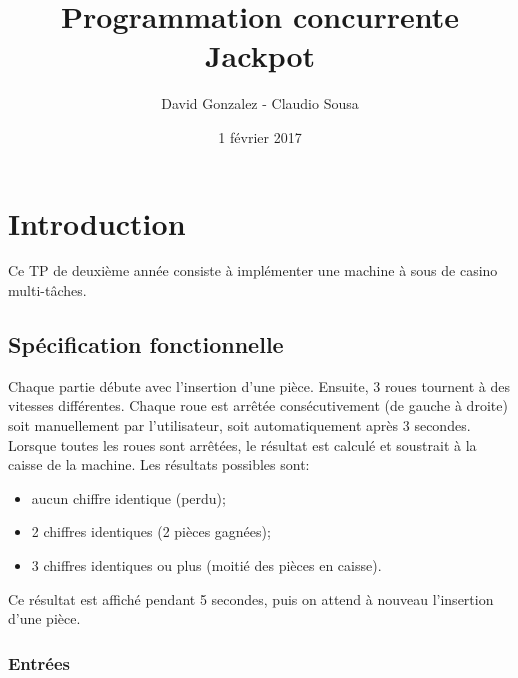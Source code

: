 \documentclass[11pt, a4paper]{article}
\begin{document}
\title
{
    \Huge{Programmation concurrente} \\
    \Huge{Jackpot}
}
\author
{
    \LARGE{David Gonzalez - Claudio Sousa}
}
\date{1 février 2017}
\maketitle

\begin{center}
\end{center}

\thispagestyle{empty}

\newpage

\section{Introduction}

Ce TP de deuxième année consiste à implémenter une machine à sous de casino multi-tâches.

\subsection{Spécification fonctionnelle}

Chaque partie débute avec l'insertion d'une pièce.
Ensuite, 3 roues tournent à des vitesses différentes.
Chaque roue est arrêtée consécutivement (de gauche à droite)
soit manuellement par l'utilisateur, soit automatiquement après 3 secondes. \\

Lorsque toutes les roues sont arrêtées, le résultat est calculé et soustrait à la caisse de la machine.
Les résultats possibles sont:
\begin{itemize}
    \item aucun chiffre identique (perdu);
    \item 2 chiffres identiques (2 pièces gagnées);
    \item 3 chiffres identiques ou plus (moitié des pièces en caisse). \\
\end{itemize}

Ce résultat est affiché pendant 5 secondes, puis on attend à nouveau l'insertion d'une pièce.

\subsubsection{Entrées}
\end{document}
